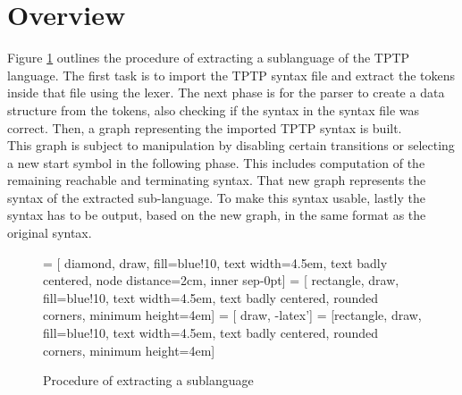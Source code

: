 \section{Overview}\label{sec:ConceptOverview}
Figure \ref{fig:ConceptProcessSublanguage} outlines the procedure of extracting a sublanguage of the \ac{TPTP} language.
The first task is to import the \ac{TPTP} syntax file and extract the tokens inside that file using the lexer.
The next phase is for the parser to create a data structure from the tokens, also checking if the syntax in the syntax file was correct.
Then, a graph representing the imported \ac{TPTP} syntax is built.\\
This graph is subject to manipulation by disabling certain transitions or selecting a new start symbol in the following phase.
This includes computation of the remaining reachable and terminating syntax.
That new graph represents the syntax of the extracted sub-language.
To make this syntax usable, lastly the syntax has to be output, based on the new graph, in the same format as the original syntax.
\begin{figure}[H]
 = [ diamond, draw, fill=blue!10, text width=4.5em, text badly centered, node distance=2cm, inner sep-0pt]  
 = [ rectangle, draw, fill=blue!10, text width=4.5em, text badly centered, rounded corners, minimum height=4em]  
 = [ draw, -latex']  
 = [rectangle, draw, fill=blue!10, text width=4.5em, text badly centered, rounded corners, minimum height=4em]  
\begin{center}
\end{center}
\caption{Procedure of extracting a sublanguage}
\label{fig:ConceptProcessSublanguage}
\end{figure}

